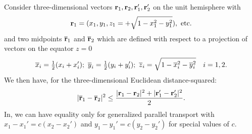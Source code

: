 \documentclass[invmat]{svjour}
\begin{document}
\begin{lemma}
\label{l:midpoint_sphere}
Consider three-dimensional vectors $\mathbf{r}_1, \mathbf{r}_2, \mathbf{r}_1', \mathbf{r}_2'$
on the unit hemisphere with
\begin{align*}
\mathbf{r}_1=(x_1,y_1,z_1= + \sqrt{1 - x_1^2 - y_1^2}),\ \text{etc}.
\end{align*}
and two midpoints $\overline{\mathbf{r}}_1$ and $\overline{\mathbf{r}}_2$  which are defined
with respect to a projection of vectors on the equator $z=0$
\begin{align}
\overline{x}_i=\tfrac{1}{2} (x_i+x_i');\ \overline{y}_i=\tfrac{1}{2} (y_i+y_i');\
\overline{z}_i = \sqrt{1-\overline{x}_i^2 - \overline{y}_i^2}\quad i=1,2.
\label{e:projected_midpoint}
\end{align}
We then have, for the three-dimensional Euclidean distance-squared:
\begin{equation}
|\overline{\mathbf{r}}_1-\overline{\mathbf{r}}_2|^2 \le
\frac{|\mathbf{r}_1-\mathbf{r}_2|^2 + |\mathbf{r}_1'-\mathbf{r}_2'|^2 }{2}.
\label{e:sphere_inequality}
\end{equation}
In, we can have equality only for generalized
parallel transport with $x_1 - x_1'= c (x_2 - x_2')$ and $y_1- y_1' =
c (y_2 - y_2')$ for special values of $c$.
\end{lemma}
\end{document}
